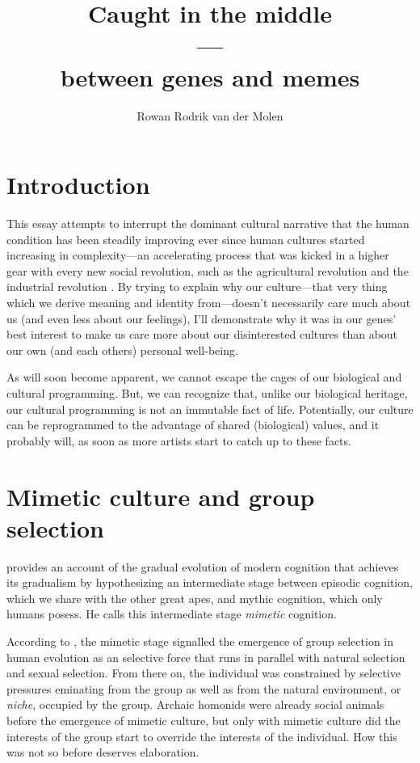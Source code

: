 \documentclass{article}
\title{Caught in the middle\\---\\between genes and memes}
\author{Rowan Rodrik van der Molen}
\begin{document}
\maketitle

\tableofcontents

\section{Introduction}
\label{sec:intro}

This essay attempts to interrupt the dominant cultural narrative that the human
condition has been steadily improving ever since human cultures started
increasing in complexity---an accelerating process that was kicked in a higher
gear with every new social revolution, such as the agricultural revolution and
the industrial revolution \citep{botton2013}. By trying to explain why our
culture---that very thing which we derive meaning and identity from---doesn't
necessarily care much about us (and even less about our feelings), I'll
demonstrate why it was in our genes' best interest to make us care more about
our disinterested cultures than about our own (and each others) personal
well-being.

As will soon become apparent, we cannot escape the cages of our biological and
cultural programming. But, we can recognize that, unlike our biological
heritage, our cultural programming is not an immutable fact of life.
Potentially, our culture can be reprogrammed to the advantage of shared
(biological) values, and it probably will, as soon as more artists start to
catch up to these facts.

\section{Mimetic culture and group selection}
\label{sec:mimesis}

\citet{donald1991} provides an account of the gradual evolution of modern
cognition that achieves its gradualism by hypothesizing an intermediate stage
between episodic cognition, which we share with the other great apes, and
mythic cognition, which only humans posess. He calls this intermediate stage
\textit{mimetic} cognition.

According to \citet{donald1991}, the mimetic stage signalled the emergence of
group selection in human evolution as an selective force that runs in parallel
with natural selection and sexual selection. From there on, the individual was
constrained by selective pressures eminating from the group as well as from
the natural environment, or \emph{niche}, occupied by the group. Archaic
homonids were already social animals before the emergence of mimetic culture,
but only with mimetic culture did the interests of the group start to override
the interests of the individual. How this was not so before deserves
elaboration.
\end{document}
